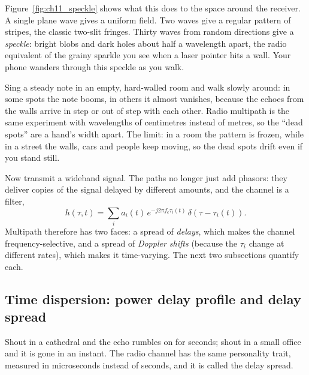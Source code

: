 Figure~\ref{fig:ch11_speckle} shows what this does to the space around the receiver. A single
plane wave gives a uniform field. Two waves give a regular pattern of stripes, the classic two-slit
fringes. Thirty waves from random directions give a \emph{speckle}: bright blobs and dark holes
about half a wavelength apart, the radio equivalent of the grainy sparkle you see when a laser
pointer hits a wall. Your phone wanders through this speckle as you walk.


\begin{analogy}
Sing a steady note in an empty, hard-walled room and walk slowly around: in some spots the note
booms, in others it almost vanishes, because the echoes from the walls arrive in step or out of
step with each other. Radio multipath is the same experiment with wavelengths of centimetres
instead of metres, so the ``dead spots'' are a hand's width apart. The limit: in a room the
pattern is frozen, while in a street the walls, cars and people keep moving, so the dead spots
drift even if you stand still.
\end{analogy}

Now transmit a wideband signal. The paths no longer just add phasors: they deliver copies of the
signal delayed by different amounts, and the channel is a filter,
\begin{equation}
h(\tau,t)=\sum_i a_i(t)\,e^{-j2\pi f_c\tau_i(t)}\,\delta(\tau-\tau_i(t)).
\label{eq:ch11:multipath}
\end{equation}
Multipath therefore has two faces: a spread of \emph{delays}, which makes the channel
frequency-selective, and a spread of \emph{Doppler shifts} (because the $\tau_i$ change at
different rates), which makes it time-varying. The next two subsections quantify each.

\subsection{Time dispersion: power delay profile and delay spread}

Shout in a cathedral and the echo rumbles on for seconds; shout in a small office and it is gone
in an instant. The radio channel has the same personality trait, measured in microseconds instead
of seconds, and it is called the delay spread.

